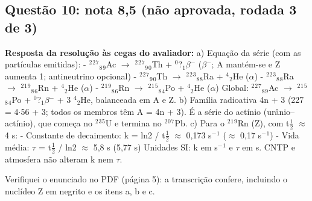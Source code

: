 \documentclass{article}%
\begin{document}
\subsection*{Questão 10: nota 8,5 (não aprovada, rodada 3 de 3)}%
\textbf{Resposta da resolução às cegas do avaliador:} a) Equação da série (com as partículas emitidas):\newline%
{-} $^2$$^2$$^{7}$$_{8}$$_{9}$Ac $\to$ $^2$$^2$$^{7}$$_{9}$$_{0}$Th + $^{0}$?$_{1}$$\beta$$^{-}$ ($\beta$$^{-}$; A mantém{-}se e Z aumenta 1; antineutrino opcional)\newline%
{-} $^2$$^2$$^{7}$$_{9}$$_{0}$Th $\to$ $^2$$^2$$^3$$_{8}$$_{8}$Ra + $^{4}$$_{2}$He ($\alpha$)\newline%
{-} $^2$$^2$$^3$$_{8}$$_{8}$Ra $\to$ $^2$$^{1}$$^{9}$$_{8}$$_{6}$Rn + $^{4}$$_{2}$He ($\alpha$)\newline%
{-} $^2$$^{1}$$^{9}$$_{8}$$_{6}$Rn $\to$ $^2$$^{1}$$^{5}$$_{8}$$_{4}$Po + $^{4}$$_{2}$He ($\alpha$)\newline%
Global: $^2$$^2$$^{7}$$_{8}$$_{9}$Ac $\to$ $^2$$^{1}$$^{5}$$_{8}$$_{4}$Po + $^{0}$?$_{1}$$\beta$$^{-}$ + 3 $^{4}$$_{2}$He, balanceada em A e Z.\newline%
\newline%
b) Família radioativa 4n + 3 (227 = 4$\cdot$56 + 3; todos os membros têm A = 4n + 3). É a série do actínio (urânio--actínio), que começa no $^2$$^3$$^{5}$U e termina no $^2$$^{0}$$^{7}$Pb.\newline%
\newline%
c) Para o $^2$$^{1}$$^{9}$Rn (Z), com t$\frac12$ $\approx$ 4 s:\newline%
{-} Constante de decaimento: k = ln2 / t$\frac12$ $\approx$ 0,173 s$^{-}$$^{1}$ ($\approx$ 0,17 s$^{-}$$^{1}$)\newline%
{-} Vida média: $\tau$ = t$\frac12$ / ln2 $\approx$ 5,8 s (5,77 s)\newline%
Unidades SI: k em s$^{-}$$^{1}$ e $\tau$ em s. CNTP e atmosfera não alteram k nem $\tau$.\par %
Verifiquei o enunciado no PDF (página 5): a transcrição confere, incluindo o nuclídeo Z em negrito e os itens a, b e c.\newline%
\newline%
\end{document}
